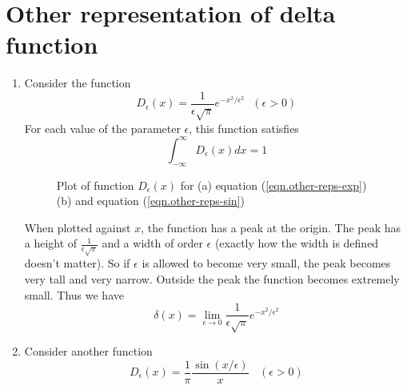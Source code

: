 	\section{Other representation of delta function}
		\begin{enumerate}
			\item 
			Consider the function
			\begin{equation}
				D_\epsilon(x) = \frac{1}{\epsilon \sqrt{\pi}} e^{-x^2/\epsilon^2}  \ \ \ (\epsilon > 0)
				\label{eqn.other-reps-exp}
			\end{equation}
			For each value of the parameter $\epsilon$, this function satisfies
			\begin{equation}
			\int_{-\infty}^{\infty} D_\epsilon(x) dx = 1
			\end{equation}
		
		\begin{figure}
			\centering
			\caption{Plot of function $D_\epsilon(x)$ for (a) equation (\ref{eqn.other-reps-exp}) (b) and equation (\ref{eqn.other-reps-sin})}
			\label{fig.cpt1.figure2}
		\end{figure}
		
		
		When plotted against $x$, the function has a peak at the origin. The peak has a height of $\frac{1}{\epsilon \sqrt{\pi}}$ and a width of order $\epsilon$ (exactly how the width is defined doesn't matter). So if $\epsilon$ is allowed to become very small, the peak becomes very tall and very narrow. Outside the peak the function becomes extremely small. Thus we have
		\begin{equation}
		\delta(x) = \lim\limits_{\epsilon \rightarrow 0}\frac{1}{\epsilon \sqrt{\pi}} e^{-x^2/\epsilon^2}
		\end{equation}
		
		
		\item
		Consider another function
		\begin{equation}
			D_\epsilon(x) = \frac{1}{\pi} \frac{\sin(x/\epsilon)}{x} \ \ \ \ (\epsilon > 0)
			\label{eqn.other-reps-sin}
		\end{equation} 
		


\end{enumerate}
